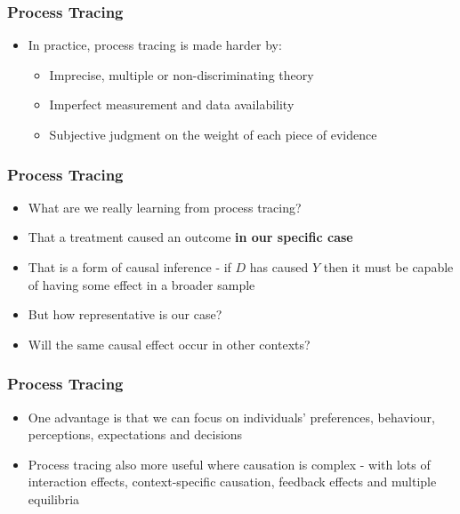 \documentclass[xcolor=x11names,compress]{beamer}\usepackage[]{graphicx}\usepackage[]{color}
\renewcommand{\(}{\begin{columns}}
\renewcommand{\)}{\end{columns}}
\newcommand{\<}[1]{\begin{column}{#1}}
\renewcommand{\>}{\end{column}}
\begin{document}
\begin{frame}
\frametitle{Process Tracing}
\begin{itemize}
\item In practice, process tracing is made harder by:
\pause
\begin{itemize}
\item Imprecise, multiple or non-discriminating theory
\pause
\item Imperfect measurement and data availability
\pause
\item Subjective judgment on the weight of each piece of evidence
\end{itemize}
\end{itemize}
\end{frame}

\begin{frame}
\frametitle{Process Tracing}
\begin{itemize}
\item What are we really learning from process tracing?
\pause
\item That a treatment caused an outcome \textbf{in our specific case}
\pause
\item That is a form of causal inference - if $D$ has caused $Y$ then it must be capable of having some effect in a broader sample
\pause
\item But how representative is our case?
\pause
\item Will the same causal effect occur in other contexts?
\end{itemize}
\end{frame}

\begin{frame}
\frametitle{Process Tracing}
\begin{itemize}
\item One advantage is that we can focus on individuals' preferences, behaviour, perceptions, expectations and decisions
\pause
\item Process tracing also more useful where causation is complex - with lots of interaction effects, context-specific causation, feedback effects and multiple equilibria
\end{itemize}
\end{frame}
\end{document}
